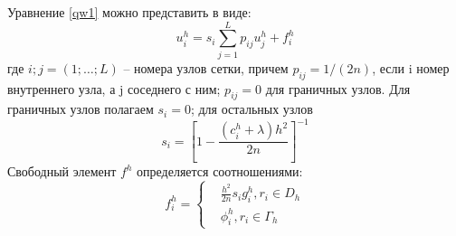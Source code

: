 Уравнение \ref{qw1} можно представить в виде:
\begin{equation}
u^{h}_{i}=s_{i}\sum^{L}_{j=1}{p_{ij}u^{h}_{j}+f^{h}_{i}}
	\label{qw2}
\end{equation} 
где $i; j = (1; \dots; L)$ --  номера узлов сетки, причем $p_{ij} = 1/(2n)$, если i 
номер внутреннего узла, а j  соседнего с ним; $p_{ij} = 0$ для граничных
узлов. Для граничных узлов полагаем $s_{i} = 0$; для остальных узлов
\begin{equation}
s_{i}= 
	\left[
1-\frac{(c^{h}_{i}+\lambda)h^{2}}{2n}
 \right]^{-1} 
	\label{qw3}
\end{equation}
Свободный элемент $f^{h}$ определяется соотношениями:
\begin{equation} f^{h}_{i}= 
	\left\{
\begin{aligned}
& \frac{h^{2}}{2n}s_{i}g^{h}_{i}, r_{i} \in D_{h}\\ & \phi^{h}_{i}, r_{i} \in \Gamma_{h}
\end{aligned}
 \right. \label{qw4}\end{equation}
